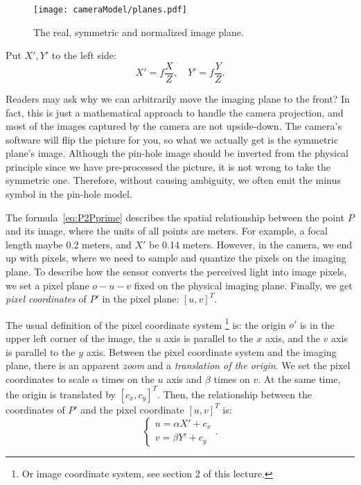 \begin{figure}[!htp]
	\centering
	\texttt{[image: cameraModel/planes.pdf]}
	\caption{The real, symmetric and normalized image plane.}
	\label{fig:planes}
\end{figure}

Put $X', Y'$ to the left side:
\begin{equation}\label{eq:P2Pprime}
X' = f\frac{X}{Z}, \quad Y' = f\frac{Y}{Z}.
\end{equation}

Readers may ask why we can arbitrarily move the imaging plane to the front? In fact, this is just a mathematical approach to handle the camera projection, and most of the images captured by the camera are not upside-down. The camera's software will flip the picture for you, so what we actually get is the symmetric plane's image. Although the pin-hole image should be inverted from the physical principle since we have pre-processed the picture, it is not wrong to take the symmetric one. Therefore, without causing ambiguity, we often emit the minus symbol in the pin-hole model.


The formula~\eqref{eq:P2Pprime} describes the spatial relationship between the point $P$ and its image, where the units of all points are meters. For example, a focal length maybe 0.2 meters, and $X'$ be 0.14 meters. However, in the camera, we end up with pixels, where we need to sample and quantize the pixels on the imaging plane. To describe how the sensor converts the perceived light into image pixels, we set a pixel plane $o-u-v$ fixed on the physical imaging plane. Finally, we get \textit{pixel coordinates} of $P'$ in the pixel plane: $[u,v]^T$.

The usual definition of the pixel coordinate system \footnote{ Or image coordinate system, see section 2 of this lecture. } is: the origin $o'$ is in the upper left corner of the image, the $u$ axis is parallel to the $x$ axis, and the $v$ axis is parallel to the $y$ axis. Between the pixel coordinate system and the imaging plane, there is an apparent \textit{zoom} and a \textit{translation of the origin}. We set the pixel coordinates to scale $\alpha$ times on the $u$ axis and $\beta$ times on $v$. At the same time, the origin is translated by $[c_x, c_y]^T$. Then, the relationship between the coordinates of $P'$ and the pixel coordinate $[u,v]^T$ is:
\begin{equation}
\label{eq:project2pixel1} 
\left\{
\begin{matrix} 
u=\alpha X' + c_x\\ 
v=\beta Y' + c_y
\end{matrix}
\right. .
\end{equation}

